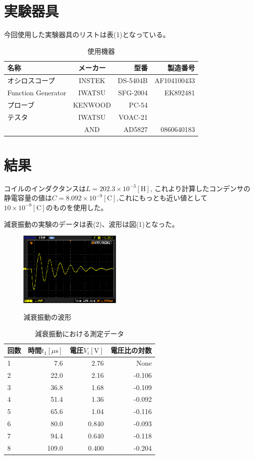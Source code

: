 \documentclass[a4j,10pt]{jarticle}
\begin{document}
\section{実験器具}
今回使用した実験器具のリストは表(1)となっている。
\begin{table}[hc]
\caption{使用機器}
\begin{tabular}{|l|c|r|r|}
\hline
名称 & メーカー & 型番 & 製造番号 \\ \hline \hline
オシロスコープ & INSTEK & DS-5404B & AF104100433 \\ \hline
Function Generator & IWATSU & SFG-2004 & EK892481 \\ \hline
プローブ&KENWOOD&PC-54&  \\ \hline
テスタ&IWATSU&VOAC-21& \\ \cline{2-4}
&AND&AD5827&0860640183 \\ \hline
\end{tabular}
\end{table}
\section{結果}
コイルのインダクタンスは$L=202.3\times10^{-3}[\mathrm H]$,
これより計算したコンデンサの静電容量の値は$C=8.092\times10^{-9}[\mathrm C]$,これにもっとも近い値として
$10\times10^{-9}[\mathrm C]$のものを使用した。

減衰振動の実験のデータは表(2)、波形は図(1)となった。
\begin{figure}[h]
\begin{center}
\label{Gensui}
\includegraphics[width=5cm]{freq.eps}
\caption{減衰振動の波形}
\end{center}
\end{figure}
\begin{table}[h]
\begin{center}
\caption{減衰振動における測定データ}
\begin{tabular}{|l|r|r|r|}
\hline
回数 & 時間$t_{1}[\mu \mathrm s]$ & 電圧$V_{i}[\mathrm V]$ & 電圧比の対数 \\ \hline \hline
1 & 7.6 & 2.76 & None \\ \hline
2 & 22.0 & 2.16 & -0.106 \\ \hline
3 & 36.8 & 1.68 & -0.109 \\ \hline
4 & 51.4 & 1.36 & -0.092 \\ \hline
5 & 65.6 & 1.04 & -0.116 \\ \hline
6 & 80.0 & 0.840 & -0.093 \\ \hline
7 & 94.4 & 0.640 & -0.118 \\ \hline
8 & 109.0 & 0.400 & -0.204 \\ \hline
\end{tabular}
\end{center}
\end{table}
\end{document}
